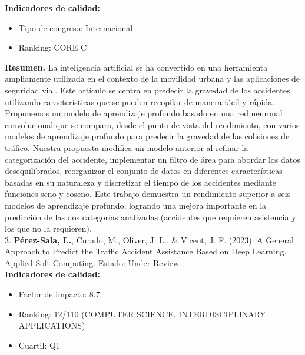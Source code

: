 \documentclass{uathesis-es}
\begin{document}
{		\textbf{Indicadores de calidad:} 
		\begin{itemize}
			\item Tipo de congreso: Internacional
			\item Ranking: CORE C
		\end{itemize}
		
		\textbf{Resumen.} La inteligencia artificial se ha convertido en una herramienta ampliamente utilizada en el contexto de la movilidad urbana y las aplicaciones de seguridad vial. Este artículo se centra en predecir la gravedad de los accidentes utilizando características que se pueden recopilar de manera fácil y rápida. Proponemos un modelo de aprendizaje profundo basado en una red neuronal convolucional que se compara, desde el punto de vista del rendimiento, con varios modelos de aprendizaje profundo para predecir la gravedad de las colisiones de tráfico. Nuestra propuesta modifica un modelo anterior al refinar la categorización del accidente, implementar un filtro de área para abordar los datos desequilibrados, reorganizar el conjunto de datos en diferentes características basadas en su naturaleza y discretizar el tiempo de los accidentes mediante funciones seno y coseno. Este trabajo demuestra un rendimiento superior a seis modelos de aprendizaje profundo, logrando una mejora importante en la predicción de las dos categorías analizadas (accidentes que requieren asistencia y los que no la requieren). \\
		
		
		3. \textbf{Pérez-Sala, L.}, Curado, M., Oliver, J. L., \& Vicent, J. F. (2023). A General Approach to Predict the Traffic Accident Assistance Based on Deep Learning. Applied Soft Computing. Estado: Under Review .\\
		
		\textbf{Indicadores de calidad:} 
		\begin{itemize}
			\item Factor de impacto: 8.7
			\item Ranking: 12/110 (COMPUTER SCIENCE, INTERDISCIPLINARY APPLICATIONS)
			
			\item Cuartil: Q1
		\end{itemize}
		
}
\end{document}
